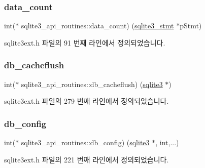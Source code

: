 \subsubsection{\texorpdfstring{data\+\_\+count}{data\_count}}
{\footnotesize\ttfamily int($\ast$ sqlite3\+\_\+api\+\_\+routines\+::data\+\_\+count) (\hyperlink{sqlite3_8h_af2a033da1327cdd77f0a174a09aedd0c}{sqlite3\+\_\+stmt} $\ast$p\+Stmt)}



sqlite3ext.\+h 파일의 91 번째 라인에서 정의되었습니다.

\mbox{\label{structsqlite3__api__routines_affc9f6591079f5929d8cfbca79927dcc}} 
\subsubsection{\texorpdfstring{db\+\_\+cacheflush}{db\_cacheflush}}
{\footnotesize\ttfamily int($\ast$ sqlite3\+\_\+api\+\_\+routines\+::db\+\_\+cacheflush) (\hyperlink{sqlite3_8h_a0ef6f2646262c8a9b24368d8ac140f69}{sqlite3} $\ast$)}



sqlite3ext.\+h 파일의 279 번째 라인에서 정의되었습니다.

\mbox{\label{structsqlite3__api__routines_aa0410a68af506e04f9b5ce6f7d2c195f}} 
\subsubsection{\texorpdfstring{db\+\_\+config}{db\_config}}
{\footnotesize\ttfamily int($\ast$ sqlite3\+\_\+api\+\_\+routines\+::db\+\_\+config) (\hyperlink{sqlite3_8h_a0ef6f2646262c8a9b24368d8ac140f69}{sqlite3} $\ast$, int,...)}



sqlite3ext.\+h 파일의 221 번째 라인에서 정의되었습니다.

\mbox{\label{structsqlite3__api__routines_a100ccb514682b7eb4280ababd67e9831}} 
